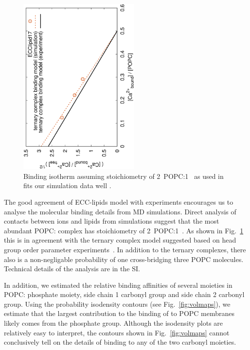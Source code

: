 \documentclass[aip,jcp,twocolumn]{revtex4}
\begin{document}
\begin{figure}[]
  \centering
  \includegraphics[height=9.0cm,angle=-90]{../Fig/bound-CAs_conc-eccl17.eps}
  \caption{\label{fig:cacl-bind}
    Binding isotherm assuming stoichiometry of 2~POPC:1~ as used in \cite{altenbach84} fits our simulation data well .
    }
\end{figure}


The good agreement of ECC-lipids model with experiments encourages us to analyse the
molecular binding details from MD simulations. Direct analysis of contacts between ions and
lipids from simulations suggest that the most abundant POPC: complex 
has stoichiometry of 2~POPC:1~.
As shown in Fig.~\ref{fig:cacl-bind} this is in agreement
with the ternary complex model suggested based on head group order parameter
experiments~\cite{altenbach84}.
In addition to the ternary complexes, there also is a non-negligable probability
of one  cross-bridging three POPC molecules.
Technical details of the analysis are in the SI. 

In addition, we estimated the relative binding affinities of several moieties in POPC:
phosphate moiety, side chain 1 carbonyl group and side chain 2 carbonyl group.
Using the probability isodensity contours (see Fig.~\ref{fig:volmaps}), 
we estimate that the largest contribution
to the binding of  to POPC membranes likely comes from the phosphate group. 
Although the isodensity plots are relatively easy to interpret,
the contours shown in Fig.~\ref{fig:volmaps} cannot conclusively tell on the details
of  binding to any of the two carbonyl moieties. 
\end{document}

